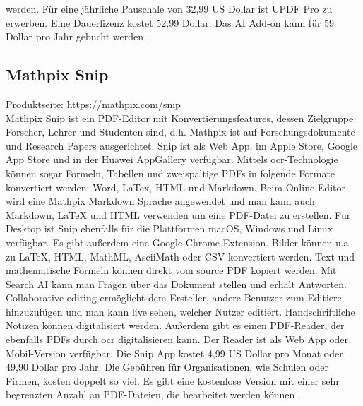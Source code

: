 werden. Für eine jährliche Pauschale von 32,99 US Dollar ist UPDF Pro zu erwerben. Eine Dauerlizenz kostet 52,99 Dollar. Das AI Add-on kann für 59 Dollar pro Jahr gebucht werden \cite{updf-um}. 

\subsection{Mathpix Snip}
Produktseite: \url{https://mathpix.com/snip} \\
Mathpix Snip ist ein PDF-Editor mit Konvertierungsfeatures, dessen Zielgruppe Forscher, Lehrer und Studenten sind, d.h. Mathpix ist auf Forschungsdokumente und Research Papers ausgerichtet. Snip ist als Web App, im Apple Store, Google App Store und in der Huawei AppGallery verfügbar. Mittels \gls{ocr}-Technologie können sogar Formeln, Tabellen und zweispaltige PDFs in folgende Formate konvertiert werden: Word, LaTex, HTML und Markdown. Beim Online-Editor wird eine Mathpix Markdown Sprache angewendet
und man kann auch Markdown, LaTeX und HTML verwenden um eine PDF-Datei zu erstellen. Für Desktop ist Snip ebenfalls für die Plattformen macOS, Windows und Linux verfügbar. Es gibt außerdem eine Google Chrome Extension. Bilder können u.a. zu LaTeX, HTML, MathML, AsciiMath oder CSV konvertiert werden. Text und mathematische Formeln können direkt vom source PDF kopiert werden. Mit Search AI kann man Fragen über das Dokument stellen und erhält Antworten. Collaborative editing ermöglicht dem Ersteller, andere Benutzer zum Editiere hinzuzufügen und man kann live sehen, welcher Nutzer editiert. Handschriftliche Notizen können digitalisiert werden. Außerdem gibt es einen PDF-Reader, der ebenfalls PDFs durch \gls{ocr} digitalisieren kann. Der Reader ist als Web App oder Mobil-Version verfügbar. Die Snip App kostet 4,99 US Dollar pro Monat oder 49,90 Dollar pro Jahr. Die Gebühren für Organisationen, wie Schulen oder Firmen, kosten doppelt so viel. Es gibt eine kostenlose Version mit einer sehr begrenzten Anzahl an PDF-Dateien, die bearbeitet werden können \cite{snip-um}.
